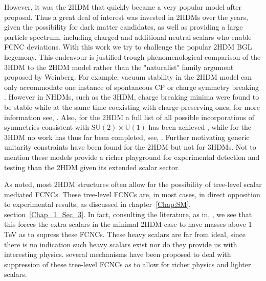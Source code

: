 
However, it was the 2HDM that quickly became a very popular model after  proposal. 
%
Thus a great deal of interest was invested in 2HDMs over the years, given the possibility for dark matter candidates, as well as providing a large particle spectrum, including charged and additional neutral scalars who enable FCNC deviations.
%
With this work we try to challenge the popular 2HDM BGL hegemony.
%
This endeavour is justified trough phenomenological comparison of the 3HDM to the 2HDM model rather than  the "naturalist" family argument proposed by Weinberg.
%
For example, vacuum stability in the 2HDM model can only accommodate one instance of spontaneous CP or charge symmetry breaking \cite{Branco_2012,Ferreira_2004,Barroso_2007}. 
%
However in NHDMs, such as the 3HDM, charge breaking minima were found to be stable while at the same time coexisting with charge-preserving ones, for more information see, \cite{Barroso_2006}.   
%
Also, for the 2HDM a full list of all possible incorporations of symmetries consistent with $\mathrm{SU(2)}\times\mathrm{U(1)}$ has been achieved \cite{Ivanov_2008,Ivanov2007}, while for the 3HDM no work has thus far been completed, see, \cite{Ivanov_2012,Ivanov_2015}. 
%
Further motivating generic unitarity constraints have been found for the 2HDM \cite{Ginzburg_2005} but not for 3HDMs. 
%
Not to mention these models provide a richer playground for experimental detection and testing than the 2HDM given its extended scalar sector. 

As noted, most 2HDM structures often allow for the possibility of tree-level scalar mediated FCNCs. 
%
These tree-level FCNCs are, in most cases, in direct opposition to experimental results, as discussed in chapter~\ref{Chap:SM}, section~\ref{Chap_1_Sec_3}. 
%
In fact, consulting the literature, as in, \cite{Branco:1999fs}, we see that this forces the extra scalars in the minimal 2HDM case to have masses above 1 TeV as to supress these FCNCs.
%
These heavy scalars are far from ideal, since there is no indication such heavy scalars exist nor do they provide us with interesting physics. 
%
 several mechanisms have been proposed to deal with suppression of these tree-level FCNCs as to allow for richer physics and lighter scalars. 

